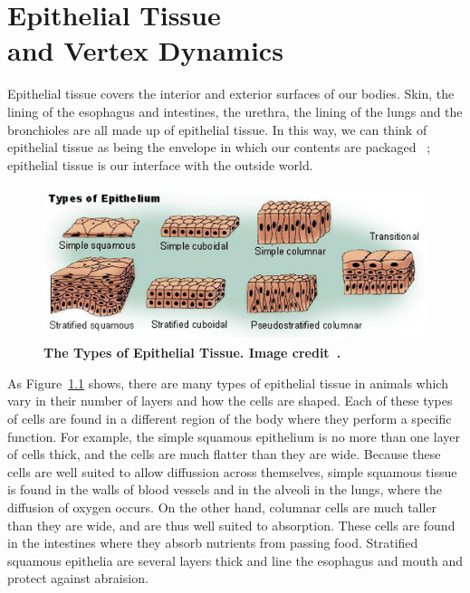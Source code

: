 \chapter{Epithelial Tissue\\ and Vertex Dynamics}
\label{chap:intro}
Epithelial tissue covers the interior and exterior surfaces of our bodies. Skin, the lining of the esophagus and intestines, the urethra, the lining of the lungs and the bronchioles are all made up of epithelial tissue. In this way, we can think of epithelial tissue as being the envelope in which our contents are packaged ~\cite{ShapeFormation}; epithelial tissue is our interface with the outside world. 

\begin{figure}[hb]
\centering \includegraphics[width=\textwidth]{../diagrams/output.png}
\caption{\textbf{The Types of Epithelial Tissue. Image credit~\cite{Epithelium}.}}
\label{fig:types}
\end{figure}

As Figure~\ref{fig:types} shows, there are many types of epithelial tissue in animals which vary in their number of layers and how the cells are shaped. Each of these types of cells are found in a different region of the body where they perform a specific function.  For example, the simple squamous epithelium is no more than one layer of cells thick, and the cells are much flatter than they are wide. Because these cells are well suited to allow diffussion across themselves, simple squamous tissue is found in the walls of blood vessels and in the alveoli in the lungs, where the diffusion of oxygen occurs. On the other hand, columnar cells are much taller than they are wide, and are thus well suited to absorption. These cells are found in the intestines where they absorb nutrients from passing food. Stratified squamous epithelia are several layers thick and line the esophagus and mouth and protect against abraision.

